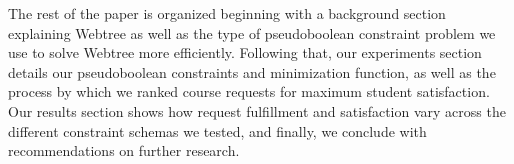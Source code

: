 The rest of the paper is organized beginning with a background section
explaining Webtree as well as the type of pseudoboolean constraint
problem we use to solve Webtree more efficiently. Following that, our 
experiments section details our pseudoboolean constraints and minimization
function, as well as the process by which we ranked course requests
for maximum student satisfaction. Our results section shows how request
fulfillment and satisfaction vary across the different constraint schemas
we tested, and finally, we conclude with recommendations on further research.



